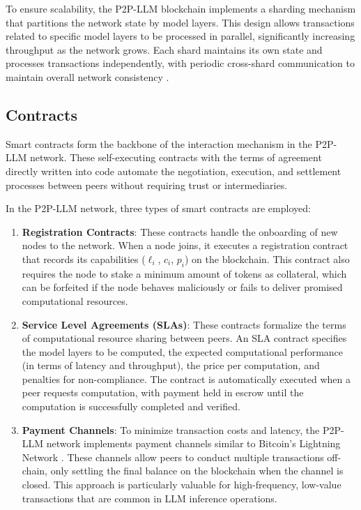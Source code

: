 \documentclass[preprint,twoside,11pt]{article}
\begin{document}
To ensure scalability, the P2P-LLM blockchain implements a sharding mechanism that partitions the network state by model layers. This design allows transactions related to specific model layers to be processed in parallel, significantly increasing throughput as the network grows. Each shard maintains its own state and processes transactions independently, with periodic cross-shard communication to maintain overall network consistency \citep{yu2020survey}.

\subsection{Contracts}

Smart contracts form the backbone of the interaction mechanism in the P2P-LLM network. These self-executing contracts with the terms of agreement directly written into code automate the negotiation, execution, and settlement processes between peers without requiring trust or intermediaries.

In the P2P-LLM network, three types of smart contracts are employed:

\begin{enumerate}
	\item \textbf{Registration Contracts}: These contracts handle the onboarding of new nodes to the network. When a node joins, it executes a registration contract that records its capabilities ($\ell_i$, $c_i$, $p_i$) on the blockchain. This contract also requires the node to stake a minimum amount of tokens as collateral, which can be forfeited if the node behaves maliciously or fails to deliver promised computational resources.
	\item \textbf{Service Level Agreements (SLAs)}: These contracts formalize the terms of computational resource sharing between peers. An SLA contract specifies the model layers to be computed, the expected computational performance (in terms of latency and throughput), the price per computation, and penalties for non-compliance. The contract is automatically executed when a peer requests computation, with payment held in escrow until the computation is successfully completed and verified.
	\item \textbf{Payment Channels}: To minimize transaction costs and latency, the P2P-LLM network implements payment channels similar to Bitcoin's Lightning Network \citep{poon2016bitcoin}. These channels allow peers to conduct multiple transactions off-chain, only settling the final balance on the blockchain when the channel is closed. This approach is particularly valuable for high-frequency, low-value transactions that are common in LLM inference operations.
\end{enumerate}
\end{document}
